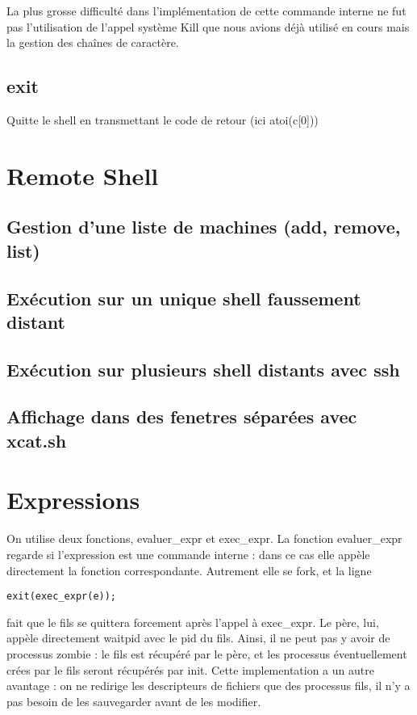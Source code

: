 \documentclass[12pt]{article}
\begin{document}
La plus grosse difficulté dans l'implémentation de cette commande interne ne fut pas l'utilisation de l'appel système Kill que nous avions déjà utilisé en cours mais la gestion des chaînes de caractère.

\subsection{exit}
Quitte le shell en transmettant le code de retour (ici atoi(c[0]))

\newpage
\section{Remote Shell}
\subsection{Gestion d'une liste de machines (add, remove, list)}

\subsection{Exécution sur un unique shell faussement distant}

\subsection{Exécution sur plusieurs shell distants avec ssh}

\subsection{Affichage dans des fenetres séparées avec xcat.sh}

\newpage
\section{Expressions}
On utilise deux fonctions, evaluer\_expr et exec\_expr.
La fonction evaluer\_expr regarde si l'expression est une commande interne : dans ce cas elle appèle directement
la fonction correspondante. Autrement elle se fork, et la ligne 
\begin{verbatim}
exit(exec_expr(e));
\end{verbatim}
fait que le fils se quittera forcement après l'appel à exec\_expr.
\newline Le père, lui, appèle directement waitpid avec le pid du fils.
Ainsi, il ne peut pas y avoir de processus zombie : le fils est récupéré par le père,
et les processus éventuellement crées par le fils seront récupérés par init.\newline
Cette implementation a un autre avantage : on ne redirige les descripteurs de fichiers que des processus fils,
il n'y a pas besoin de les sauvegarder avant de les modifier.
\end{document}

